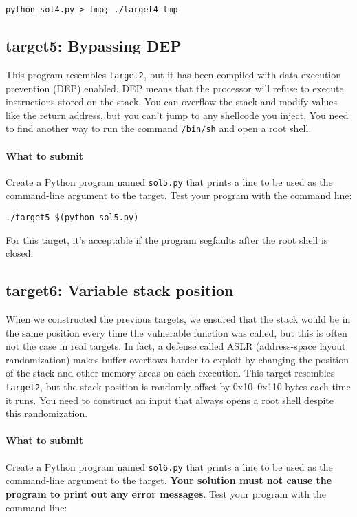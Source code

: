 \documentclass[letterpaper,12pt]{report}
\begin{document}
{\smallskip

\quad\texttt{python sol4.py > tmp; ./target4 tmp}

\subsection*{target5: Bypassing DEP } 
\label{sec:target5}

This program resembles \texttt{target2}, but it has been compiled with data execution prevention (DEP) enabled.  DEP means that the processor will refuse to execute instructions stored on the stack.  You can overflow the stack and modify values like the return address, but you can't jump to any shellcode you inject.  You need to find another way to run the command \texttt{/bin/sh} and open a root shell.

\paragraph{What to submit}
Create a Python program named \texttt{sol5.py} that prints a line to be used as the command-line argument to the target.  Test your program with the command line:

\smallskip

\quad\texttt{./target5 \$(python sol5.py)}

\medskip

For this target, it's acceptable if the program segfaults after the root shell is closed.

\subsection*{target6: Variable stack position }
\label{sec:target6}

When we constructed the previous targets, we ensured that the stack would be in the same position every time the vulnerable function was called, but this is often not the case in real targets.  In fact, a defense called ASLR (address-space layout randomization) makes buffer overflows harder to exploit by changing the position of the stack and other memory areas on each execution.  This target resembles \texttt{target2}, but the stack position is randomly offset by 0x10--0x110 bytes each time it runs.  You need to construct an input that always opens a root shell despite this randomization.

\paragraph{What to submit}
Create a Python program named \texttt{sol6.py} that prints a line to be used as
the command-line argument to the target. \textbf{Your solution must not cause the program to print out any error messages}. Test your program with the command line:

}
\end{document}
